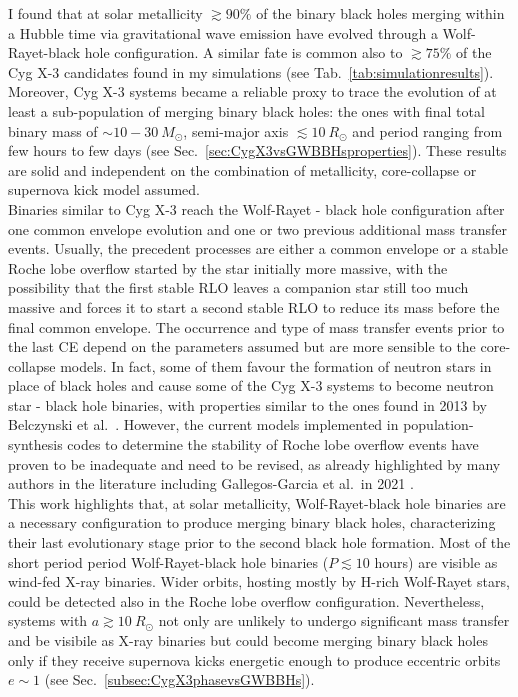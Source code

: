 \documentclass[a4paper,titlepage]{book}     	%
\newcommand{\sun}{\ensuremath{_\odot}}
\newcommand{\msun}{\ensuremath{M\sun}}
\newcommand{\rsun}{R_{\odot}}
\begin{document}
I found that at solar metallicity $\gtrsim 90 \%$ of the binary black holes merging within a Hubble time via gravitational wave emission have evolved through a Wolf-Rayet-black hole configuration. A similar fate is common also to $\gtrsim 75 \%$ of the Cyg X-3 candidates found in my simulations (see Tab.\ \ref{tab:simulationresults}). Moreover, Cyg X-3 systems became a reliable proxy to trace the evolution of at least a sub-population of merging binary black holes: the ones with final total binary mass of $\sim 10-30~\msun$, semi-major axis $\lesssim 10~\rsun$ and period ranging from few hours to few days (see Sec.\ \ref{sec:CygX3vsGWBBHsproperties}). These results are solid and independent on the combination of metallicity, core-collapse or supernova kick model assumed. \\

Binaries similar to Cyg X-3 reach the Wolf-Rayet - black hole configuration after one common envelope evolution and one or two previous additional mass transfer events. Usually, the precedent processes are either a common envelope or a stable Roche lobe overflow started by the star initially more massive, with the possibility that the first stable RLO leaves a companion star still too much massive and forces it to start a second stable RLO to reduce its mass before the final common envelope. The occurrence and type of mass transfer events prior to the last CE depend on the parameters assumed but are more sensible to the core-collapse models. In fact, some of them favour the formation of neutron stars in place of black holes and cause some of the Cyg X-3 systems to become neutron star - black hole binaries, with properties similar to the ones found in 2013 by Belczynski et al.\ \cite{Belczynski2013_CygX-3fate}. However, the current models implemented in population-synthesis codes to determine the stability of Roche lobe overflow events have proven to be inadequate and need to be revised, as already highlighted by many authors in the literature including Gallegos-Garcia et al.\ in 2021 \cite{gallegos2021MESAvspopsynth}.\\

This work highlights that, at solar metallicity, Wolf-Rayet-black hole binaries are a necessary configuration to produce merging binary black holes, characterizing their last evolutionary stage prior to the second black hole formation. Most of the short period period Wolf-Rayet-black hole binaries ($P \lesssim 10$ hours) are visible as wind-fed X-ray binaries. Wider orbits, hosting mostly by H-rich Wolf-Rayet stars, could be detected also in the Roche lobe overflow configuration. Nevertheless, systems with $a \gtrsim 10~\rsun$ not only are unlikely to undergo significant mass transfer and be visibile as X-ray binaries but could become merging binary black holes only if they receive supernova kicks energetic enough to produce eccentric orbits $e\sim 1$ (see Sec.\ \ref{subsec:CygX3phasevsGWBBHs}).\\
\\
\end{document}
